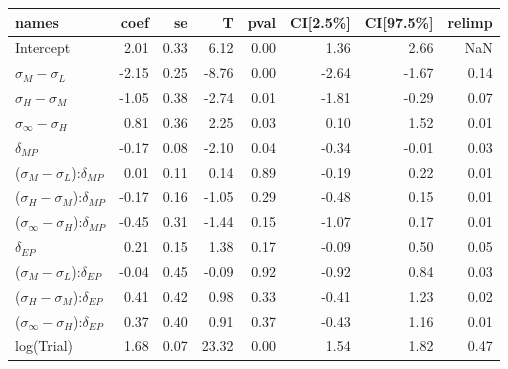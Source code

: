 

\begin{tabular}{lrrrrrrr}
\toprule
                                         names &  coef &   se &     T &  pval &  CI[2.5\%] &  CI[97.5\%] &  relimp \\
\midrule
                                     Intercept &  2.01 & 0.33 &  6.12 &  0.00 &       1.36 &        2.66 &     NaN \\
                     $\sigma_{M} - \sigma_{L}$ & -2.15 & 0.25 & -8.76 &  0.00 &      -2.64 &       -1.67 &    0.14 \\
                     $\sigma_{H} - \sigma_{M}$ & -1.05 & 0.38 & -2.74 &  0.01 &      -1.81 &       -0.29 &    0.07 \\
                $\sigma_{\infty} - \sigma_{H}$ &  0.81 & 0.36 &  2.25 &  0.03 &       0.10 &        1.52 &    0.01 \\
                                 $\delta_{MP}$ & -0.17 & 0.08 & -2.10 &  0.04 &      -0.34 &       -0.01 &    0.03 \\
     ($\sigma_{M} - \sigma_{L}$):$\delta_{MP}$ &  0.01 & 0.11 &  0.14 &  0.89 &      -0.19 &        0.22 &    0.01 \\
     ($\sigma_{H} - \sigma_{M}$):$\delta_{MP}$ & -0.17 & 0.16 & -1.05 &  0.29 &      -0.48 &        0.15 &    0.01 \\
($\sigma_{\infty} - \sigma_{H}$):$\delta_{MP}$ & -0.45 & 0.31 & -1.44 &  0.15 &      -1.07 &        0.17 &    0.01 \\
                                 $\delta_{EP}$ &  0.21 & 0.15 &  1.38 &  0.17 &      -0.09 &        0.50 &    0.05 \\
     ($\sigma_{M} - \sigma_{L}$):$\delta_{EP}$ & -0.04 & 0.45 & -0.09 &  0.92 &      -0.92 &        0.84 &    0.03 \\
     ($\sigma_{H} - \sigma_{M}$):$\delta_{EP}$ &  0.41 & 0.42 &  0.98 &  0.33 &      -0.41 &        1.23 &    0.02 \\
($\sigma_{\infty} - \sigma_{H}$):$\delta_{EP}$ &  0.37 & 0.40 &  0.91 &  0.37 &      -0.43 &        1.16 &    0.01 \\
                                    log(Trial) &  1.68 & 0.07 & 23.32 &  0.00 &       1.54 &        1.82 &    0.47 \\
\bottomrule
\end{tabular}


